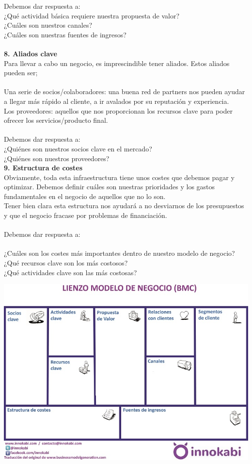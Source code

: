 {Debemos dar respuesta a:\\
¿Qué actividad básica requiere nuestra propuesta de valor?\\
¿Cuáles son nuestros canales?\\
¿Cuáles son nuestras fuentes de ingresos?\\\\
\textbf{8. Aliados clave}\\
Para llevar a cabo un negocio, es imprescindible tener aliados. Estos aliados pueden ser;\\\\
Una serie de socios/colaboradores: una buena red de partners nos pueden ayudar a llegar más rápido al cliente, a ir avalados por su reputación y experiencia.\\
Los proveedores: aquellos que nos proporcionan los recursos clave para poder ofrecer los servicios/producto final.\\\\
Debemos dar respuesta a:\\
¿Quiénes son nuestros socios clave en el mercado?\\
¿Quiénes son nuestros proveedores?\\
\textbf{9. Estructura de costes}\\
Obviamente, toda esta infraestructura tiene unos costes que debemos pagar y optimizar. Debemos definir cuáles son nuestras prioridades y los gastos fundamentales en el negocio de aquellos que no lo son.\\
Tener bien clara esta estructura nos ayudará a no desviarnos de los presupuestos y que el negocio fracase por problemas de financiación.\\\\
Debemos dar respuesta a:\\\\
¿Cuáles son los costes más importantes dentro de nuestro modelo de negocio?\\
¿Qué recursos clave son los más costosos?\\
¿Qué actividades clave son las más costosas?\\
}
\begin{center}
\includegraphics[width=15cm]{./Imagenes/imagen4}
\end{center}

